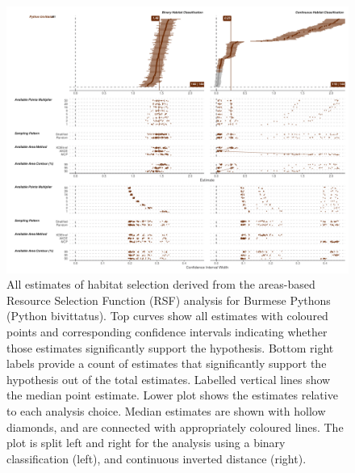 \documentclass[10pt,a4paper]{article}
\begin{document}
\begin{figure}
\includegraphics[width=1\linewidth]{../../figures/specCurve_Python bivittatus_rsf} \caption{All estimates of habitat selection derived from the areas-based Resource Selection Function (RSF) analysis for Burmese Pythons (Python bivittatus). Top curves show all estimates with coloured points and corresponding confidence intervals indicating whether those estimates significantly support the hypothesis. Bottom right labels provide a count of estimates that significantly support the hypothesis out of the total estimates. Labelled vertical lines show the median point estimate. Lower plot shows the estimates relative to each analysis choice. Median estimates are shown with hollow diamonds, and are connected with appropriately coloured lines. The plot is split left and right for the analysis using a binary classification (left), and continuous inverted distance (right).}\label{fig:specCurveRsfPYBI}
\end{figure}
\end{document}
